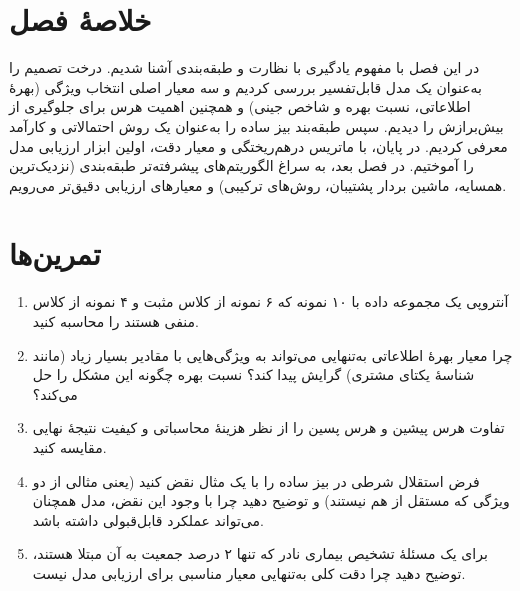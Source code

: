 \section*{خلاصهٔ فصل}

در این فصل با مفهوم یادگیری با نظارت و طبقه‌بندی آشنا شدیم. درخت تصمیم
را به‌عنوان یک مدل قابل‌تفسیر بررسی کردیم و سه معیار اصلی انتخاب ویژگی
(بهرهٔ اطلاعاتی، نسبت بهره و شاخص جینی) و همچنین اهمیت هرس برای جلوگیری
از بیش‌برازش را دیدیم. سپس طبقه‌بند بیز ساده را به‌عنوان یک روش
احتمالاتی و کارآمد معرفی کردیم. در پایان، با ماتریس درهم‌ریختگی و معیار
دقت، اولین ابزار ارزیابی مدل را آموختیم. در فصل بعد، به سراغ
الگوریتم‌های پیشرفته‌تر طبقه‌بندی (نزدیک‌ترین همسایه، ماشین بردار
پشتیبان، روش‌های ترکیبی) و معیارهای ارزیابی دقیق‌تر می‌رویم.

\section*{تمرین‌ها}

\begin{enumerate}
    \item آنتروپی یک مجموعه داده با ۱۰ نمونه که ۶ نمونه از کلاس مثبت و
          ۴ نمونه از کلاس منفی هستند را محاسبه کنید.
    \item چرا معیار بهرهٔ اطلاعاتی به‌تنهایی می‌تواند به ویژگی‌هایی با
          مقادیر بسیار زیاد (مانند شناسهٔ یکتای مشتری) گرایش پیدا کند؟
          نسبت بهره چگونه این مشکل را حل می‌کند؟
    \item تفاوت هرس پیشین و هرس پسین را از نظر هزینهٔ محاسباتی و کیفیت
          نتیجهٔ نهایی مقایسه کنید.
    \item فرض استقلال شرطی در بیز ساده را با یک مثال نقض کنید (یعنی
          مثالی از دو ویژگی که مستقل از هم نیستند) و توضیح دهید چرا با
          وجود این نقض، مدل همچنان می‌تواند عملکرد قابل‌قبولی داشته باشد.
    \item برای یک مسئلهٔ تشخیص بیماری نادر که تنها ۲ درصد جمعیت به آن
          مبتلا هستند، توضیح دهید چرا دقت کلی به‌تنهایی معیار مناسبی
          برای ارزیابی مدل نیست.
\end{enumerate}
